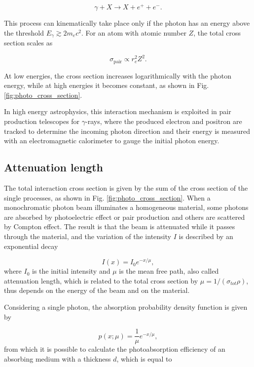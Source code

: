 \begin{equation}
\gamma + X \rightarrow X + e^+ + e^- .
\end{equation}

This process can kinematically take place only if the photon has an energy above the threshold $E_{\gamma} \gtrsim 2 m_e c^2$. For an atom with atomic number $Z$, the total cross section scales as 

\begin{equation}
\sigma_{\textrm{pair}} \propto r_e^2 Z^2.
\end{equation}

At low energies, the cross section increases logarithmically with the photon energy, while at high energies it becomes constant, as shown in Fig. \ref{fig:photo_cross_section}.

In high energy astrophysics, this interaction mechanism is exploited in pair production telescopes for $\gamma$-rays, where the produced electron and positron are tracked to determine the incoming photon direction and their energy is measured with an electromagnetic calorimeter to gauge the initial photon energy.

\subsection{Attenuation length}

The total interaction cross section is given by the sum of the cross section of the single processes, as shown in Fig. \ref{fig:photo_cross_section}. When a monochromatic photon beam illuminates a homogeneous material, some photons are absorbed by photoelectric effect or pair production and others are scattered by Compton effect. The result is that the beam is attenuated while it passes through the material, and the variation of the intensity $I$ is described by an exponential decay

\begin{equation}
I(x) = I_0 e^{-x/\mu},
\label{eq:beam_intensity}
\end{equation}
where $I_0$ is the initial intensity and $\mu$ is the mean free path, also called attenuation length, which is related to the total cross section by $\mu = 1 /(\sigma_{tot} \rho)$, thus depends on the energy of the beam and on the material.

Considering a single photon, the absorption probability density function is given by

\begin{equation}
p(x; \mu) = \frac{1}{\mu} e^{-x/\mu},
\label{eq:pdf_photoabs}
\end{equation}
from which it is possible to calculate the photoabsorption efficiency of an absorbing medium with a thickness $d$, which is equal to

